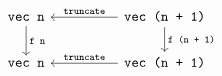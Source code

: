 \documentclass{article}
\begin{document}
\[\begin{tikzcd}
	{\texttt{vec n}} && {\texttt{vec (n + 1)}} \\
	{\texttt{vec n}} && {\texttt{vec (n + 1)}}
	\arrow["{\texttt{f n}}", from=1-1, to=2-1]
	\arrow["{\texttt{f (n + 1)}}", from=1-3, to=2-3]
	\arrow["{\texttt{truncate}}"', from=1-3, to=1-1]
	\arrow["{\texttt{truncate}}"', from=2-3, to=2-1]
\end{tikzcd}\]
\end{document}
